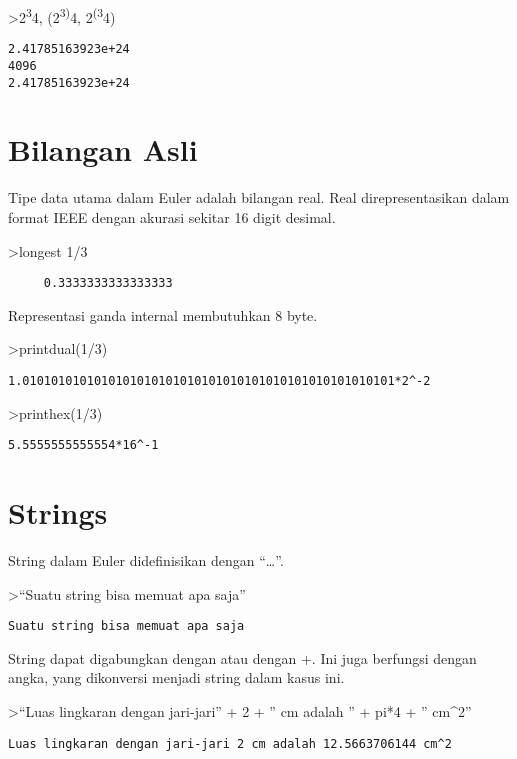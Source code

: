 \documentclass[
]{book}
\begin{document}
\textgreater2\textsuperscript{3}4, (2\textsuperscript{3)}4, 2\textsuperscript{(3}4)

\begin{verbatim}
2.41785163923e+24
4096
2.41785163923e+24
\end{verbatim}

\section{Bilangan Asli}\label{bilangan-asli}

Tipe data utama dalam Euler adalah bilangan real. Real direpresentasikan dalam format IEEE dengan akurasi sekitar 16 digit desimal.

\textgreater longest 1/3

\begin{verbatim}
     0.3333333333333333 
\end{verbatim}

Representasi ganda internal membutuhkan 8 byte.

\textgreater printdual(1/3)

\begin{verbatim}
1.0101010101010101010101010101010101010101010101010101*2^-2
\end{verbatim}

\textgreater printhex(1/3)

\begin{verbatim}
5.5555555555554*16^-1
\end{verbatim}

\section{Strings}\label{strings}

String dalam Euler didefinisikan dengan ``\ldots{}''.

\textgreater{}``Suatu string bisa memuat apa saja''

\begin{verbatim}
Suatu string bisa memuat apa saja
\end{verbatim}

String dapat digabungkan dengan \textbar{} atau dengan +. Ini juga berfungsi dengan angka, yang dikonversi menjadi string dalam kasus ini.

\textgreater{}``Luas lingkaran dengan jari-jari'' + 2 + '' cm adalah '' + pi*4 + '' cm\^{}2''

\begin{verbatim}
Luas lingkaran dengan jari-jari 2 cm adalah 12.5663706144 cm^2
\end{verbatim}
\end{document}

